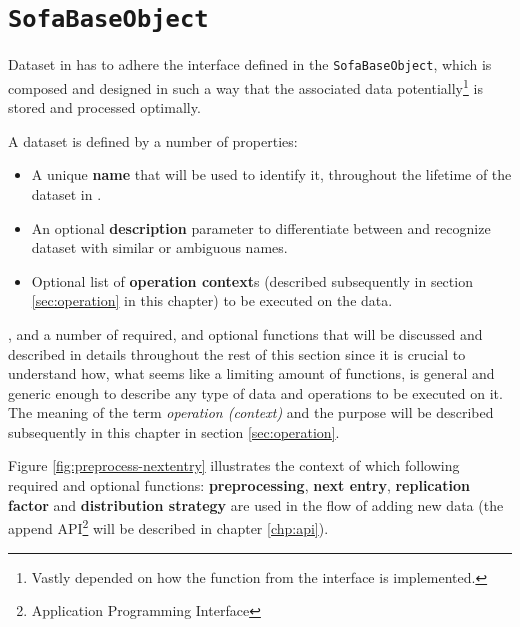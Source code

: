 \newpage

\section{\texttt{SofaBaseObject}} \label{sec:sofabaseobject}
Dataset in \CodeName has to adhere the interface defined in the \texttt{SofaBaseObject}, which is composed and designed in such a way that the associated data potentially\footnote{Vastly depended on how the function from the interface is implemented.} is stored and processed optimally.

\vspace*{5mm}
A dataset is defined by a number of properties:
\begin{itemize}
	\item A unique \textbf{name} that will be used to identify it, throughout the lifetime of the dataset in \CodeName.
	\item An optional \textbf{description} parameter to differentiate between and recognize dataset with similar or ambiguous names.
	\item Optional list of \textbf{operation context}s (described subsequently in section \ref{sec:operation} in this chapter) to be executed on the data.
\end{itemize}
\vspace*{5mm}

, and a number of required, and optional functions that will be discussed and described in details throughout the rest of this section since it is crucial to understand how, what seems like a limiting amount of functions, is general and generic enough to describe any type of data and operations to be executed on it. The meaning of the term \textit{operation (context)} and the purpose will be described subsequently in this chapter in section \ref{sec:operation}. 
\newline

Figure \ref{fig:preprocess-nextentry} illustrates the context of which following required and optional functions: \textbf{preprocessing}, \textbf{next entry}, \textbf{replication factor} and \textbf{distribution strategy} are used in the flow of adding new data (the append API\footnote{Application Programming Interface} will be described in chapter \ref{chp:api}).


